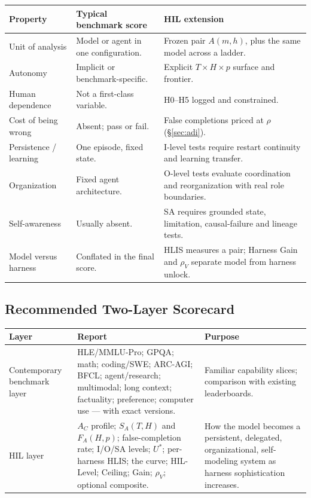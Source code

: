 \documentclass[11pt]{article}
\theoremstyle{definition}
\newcommand{\SA}{\ensuremath{S_A(T,H)}}
\newcommand{\FA}{\ensuremath{F_A(H,p)}}
\newcommand{\rhov}{\ensuremath{\rho_V}}
\begin{document}
\begin{table}[h]
\centering\small
\begin{tabularx}{\textwidth}{@{}lYY@{}}
\toprule
Property & Typical benchmark score & HIL extension \\
\midrule
Unit of analysis & Model or agent in one configuration. & Frozen pair $A(m,h)$, plus the same model across a ladder. \\
Autonomy & Implicit or benchmark-specific. & Explicit $T \times H \times p$ surface and frontier. \\
Human dependence & Not a first-class variable. & H0--H5 logged and constrained. \\
Cost of being wrong & Absent; pass or fail. & False completions priced at $\rho$ (\S\ref{sec:adi}). \\
Persistence / learning & One episode, fixed state. & I-level tests require restart continuity and learning transfer. \\
Organization & Fixed agent architecture. & O-level tests evaluate coordination and reorganization with real role boundaries. \\
Self-awareness & Usually absent. & SA requires grounded state, limitation, causal-failure and lineage tests. \\
Model versus harness & Conflated in the final score. & HLIS measures a pair; Harness Gain and \rhov{} separate model from harness unlock. \\
\bottomrule
\end{tabularx}
\end{table}

\subsection{Recommended Two-Layer Scorecard}

\begin{table}[h]
\centering\small
\begin{tabularx}{\textwidth}{@{}lYY@{}}
\toprule
Layer & Report & Purpose \\
\midrule
Contemporary benchmark layer & HLE/MMLU-Pro; GPQA; math; coding/SWE; ARC-AGI; BFCL; agent/research; multimodal; long context; factuality; preference; computer use --- with exact versions. & Familiar capability slices; comparison with existing leaderboards. \\
HIL layer & $A_C$ profile; \SA{} and \FA{}; false-completion rate; I/O/SA levels; $U^{*}$; per-harness HLIS; the curve; HIL-Level; Ceiling; Gain; \rhov{}; optional composite. & How the model becomes a persistent, delegated, organizational, self-modeling system as harness sophistication increases. \\
\bottomrule
\end{tabularx}
\end{table}
\end{document}
